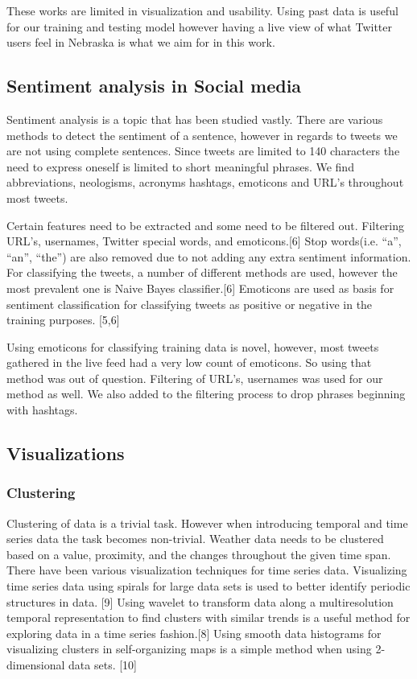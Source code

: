 \documentclass[journal]{vgtc}                %
\begin{document}
These works are limited in visualization and usability. Using past data is useful for our training and testing model however having a live view of what Twitter users feel in Nebraska is what we aim for in this work.


\subsection{Sentiment analysis in Social media}
Sentiment analysis is a topic that has been studied vastly. There are various methods to detect the sentiment of a sentence, however in regards to tweets we are not using complete sentences. Since tweets are limited to 140 characters the need to express oneself is limited to short meaningful phrases. We find abbreviations, neologisms, acronyms hashtags, emoticons and URL's throughout most tweets.

Certain features need to be extracted and some need to be filtered out. Filtering URL's, usernames, Twitter special words, and emoticons.[6] Stop words(i.e. “a”, “an”, “the”) are also removed due to not adding any extra sentiment information.  For classifying the tweets, a number of different methods are used, however the most prevalent one is Naive Bayes classifier.[6] Emoticons are used as basis for sentiment classification for classifying tweets as positive or negative in the training purposes. [5,6] 

Using emoticons for classifying training data is novel, however, most tweets gathered in the live feed had a very low count of emoticons. So using that method was out of question. Filtering of URL's, usernames was used for our method as well. We also added to the filtering process to drop phrases beginning with hashtags.

\subsection{Visualizations}

\subsubsection{Clustering}
Clustering of data is a trivial task. However when introducing  temporal and time series data the task becomes non-trivial. Weather data needs to be clustered based on a value, proximity, and the changes throughout the given time span. There have been various visualization techniques for time series data. Visualizing time series data using spirals for large data sets is used to better identify periodic structures in data. [9] Using wavelet to transform data along a multiresolution temporal representation to find clusters with similar trends is a useful method for exploring data in a time series fashion.[8] Using smooth data histograms for visualizing clusters in self-organizing maps is a simple method when using 2-dimensional data sets. [10]
\end{document}
